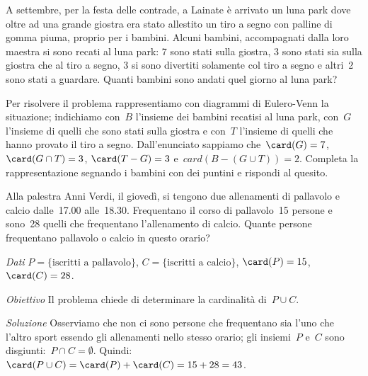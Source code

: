 {\begin{esempio}
 \end{esempio}

 \begin{esempio}
 A settembre, per la festa delle contrade, a Lainate è arrivato un luna
park dove oltre ad una grande giostra era stato allestito un tiro a
segno con palline di gomma piuma, proprio per i bambini. Alcuni
bambini, accompagnati dalla loro maestra si sono recati al luna park: 7
sono stati sulla giostra, 3 sono stati sia sulla giostra che al tiro a
segno, 3 si sono divertiti solamente col tiro a segno e altri~2 sono
stati a guardare. Quanti bambini sono andati quel giorno al luna park?

\begin{minipage}{.59 \textwidth}
Per risolvere il problema rappresentiamo con diagrammi di Eulero-Venn la 
situazione; indichiamo con~\(B\) l'insieme dei bambini recatisi al luna 
park, 
con~\(G\) l'insieme di quelli che sono stati sulla giostra e con~\(T\) 
l'insieme
di quelli che hanno provato il tiro a segno.
Dall'enunciato sappiamo 
che~\(\card(G)=7\), \(\card(G\cap T)=3\), \(\card(T-G)=3\) 
e~\(card(B-(G\cup T))=2\).
Completa la rappresentazione segnando i bambini con dei puntini e rispondi 
al quesito.
\end{minipage}
\hfill
\begin{minipage}{.39 \textwidth}
\begin{center}
 
\end{center}
\end{minipage}

\end{esempio}

\begin{esempio}
Alla palestra Anni Verdi, il giovedì, si tengono due allenamenti di 
pallavolo 
e calcio dalle~17.00 alle~18.30. Frequentano il corso di
pallavolo~15 persone e sono~28 quelli che frequentano l'allenamento di 
calcio. 
Quante persone frequentano pallavolo o calcio in questo orario?

\emph{Dati} \(P=\{\text{iscritti a pallavolo}\}\), \(C=\{\text{iscritti a 
calcio}\}\), \(\card(P)=15\), \(\card(C)=28\).

\emph{Obiettivo} Il problema chiede di determinare la cardinalità 
di~\(P\cup C\).

\emph{Soluzione} Osserviamo che non ci sono persone che frequentano sia
l'uno che l'altro sport essendo gli allenamenti nello stesso orario; gli 
insiemi~\(P\) e~\(C\) sono disgiunti:~\(P\cap C=\emptyset \). 
Quindi:~\(\card(P\cup C)=\card(P)+\card(C)=15+28=43\).
\end{esempio}

}
